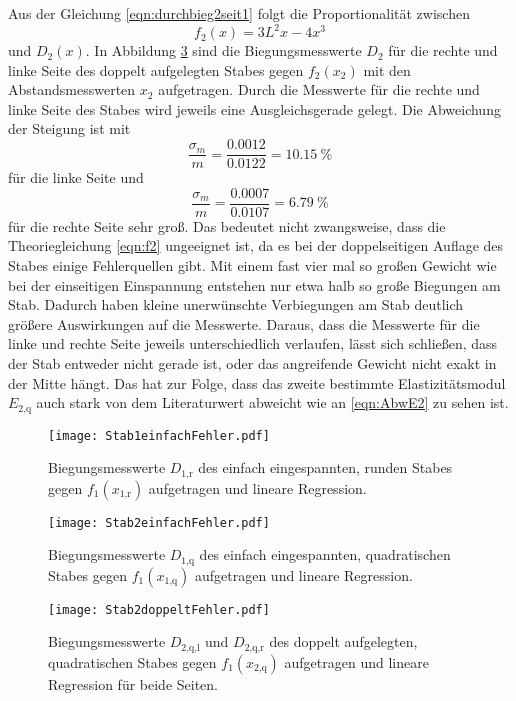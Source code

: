 Aus der Gleichung \eqref{eqn:durchbieg2seit1} folgt die Proportionalität
zwischen
\begin{equation}
  f_2(x) = 3L^2x - 4x^3
  \label{eqn:f2}
\end{equation}
und $D_2(x)$. In Abbildung \ref{fig:Stab2doppeltFehler} sind die
Biegungsmesswerte $D_2$ für die rechte und linke Seite des doppelt
aufgelegten Stabes gegen $f_2(x_2)$ mit den Abstandsmesswerten $x_2$
aufgetragen. Durch die Messwerte für die rechte und linke Seite des Stabes
wird jeweils eine Ausgleichsgerade gelegt.
Die Abweichung der Steigung ist mit
\begin{equation}
  \frac{\sigma_m}{m}=\frac{0.0012}{0.0122} = \SI{10.15}{\percent}
\end{equation}
für die linke Seite und
\begin{equation}
  \frac{\sigma_m}{m}=\frac{0.0007}{0.0107} = \SI{6.79}{\percent}
\end{equation}
für die rechte Seite sehr groß.
Das bedeutet nicht zwangsweise, dass die Theoriegleichung \eqref{eqn:f2}
ungeeignet ist, da es bei der doppelseitigen Auflage des Stabes einige
Fehlerquellen gibt. Mit einem fast vier mal so großen Gewicht wie bei
der einseitigen Einspannung entstehen nur etwa halb so große Biegungen
am Stab. Dadurch haben kleine unerwünschte Verbiegungen am Stab deutlich größere
Auswirkungen auf die Messwerte. Daraus, dass die Messwerte für die linke und
rechte Seite jeweils unterschiedlich verlaufen, lässt sich schließen, dass
der Stab entweder nicht gerade ist, oder das angreifende Gewicht nicht exakt
in der Mitte hängt. Das hat zur Folge, dass das zweite bestimmte
Elastizitätsmodul $E_\text{2,q}$ auch stark von dem Literaturwert abweicht wie
an \eqref{eqn:AbwE2} zu sehen ist.

\begin{figure}
  \centering
  \texttt{[image: Stab1einfachFehler.pdf]}
  \caption{Biegungsmesswerte $D_\text{1,r}$ des einfach eingespannten, runden
  Stabes gegen $f_1(x_\text{1,r})$ aufgetragen und lineare Regression.}
  \label{fig:Stab1einfachFehler}
\end{figure}

\begin{figure}
  \centering
  \texttt{[image: Stab2einfachFehler.pdf]}
  \caption{Biegungsmesswerte $D_\text{1,q}$ des einfach eingespannten,
  quadratischen
  Stabes gegen $f_1(x_\text{1,q})$ aufgetragen und lineare Regression.}
  \label{fig:Stab2einfachFehler}
\end{figure}

\begin{figure}
  \centering
  \texttt{[image: Stab2doppeltFehler.pdf]}
  \caption{Biegungsmesswerte $D_\text{2,q,l}$ und $D_\text{2,q,r}$ des doppelt
  aufgelegten, quadratischen Stabes gegen $f_1(x_\text{2,q})$ aufgetragen und
  lineare Regression für beide Seiten.}
  \label{fig:Stab2doppeltFehler}
\end{figure}
